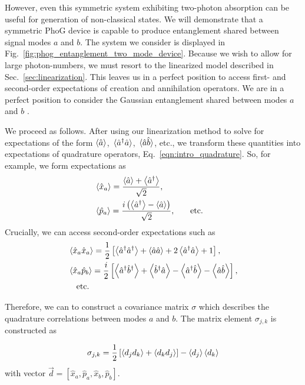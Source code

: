 However, even this symmetric system exhibiting two-photon absorption can be useful for generation of non-classical states. We will demonstrate that a symmetric PhoG device is capable to produce entanglement shared between signal modes $a$ and $b$. The system we consider is displayed in Fig.~\ref{fig:phog_entanglement_two_mode_device}. Because we wish to allow for large photon-numbers, we must resort to the linearized model described in Sec.~\ref{sec:linearization}. This leaves us in a perfect position to access first- and second-order expectations of creation and annihilation operators. We are in a perfect position to consider the Gaussian entanglement shared between modes $a$ and $b$ \cite{Weedbrook2012, Adesso2007, Simon2000}.

We proceed as follows. After using our linearization method to solve for expectations of the form $\ev{\hat{a}}$, $\ev*{\hat{a}^\dagger \hat{a}}$, $\ev*{\hat{a}\hat{b}}$, etc., we transform these quantities into expectations of quadrature operators, Eq.~\ref{eqn:intro_quadrature}. So, for example, we form expectations as 
\begin{align}
&\ev{\hat{x}_a} = \frac{\ev{\hat{a}} + \ev{\hat{a}^\dagger}}{\sqrt{2}}, \notag \\
%
&\ev{\hat{p}_a} = \frac{i \left(\ev{\hat{a}^\dagger} - \ev{\hat{a}}\right)}{\sqrt{2}}, &\qq{etc.}\notag 
\end{align}
Crucially, we can access second-order expectations such as
\begin{align}
&\ev{\hat{x}_a \hat{x}_a} = \frac{1}{2}\left[\ev{\hat{a}^\dagger \hat{a}^\dagger} + \ev{\hat{a} \hat{a}} + 2 \ev{\hat{a}^\dagger \hat{a}} + 1\right], \notag \\
%
&\ev{\hat{x}_a \hat{p}_b} = \frac{i}{2}\left[\ev{\hat{a}^\dagger \hat{b}^\dagger} + \ev{\hat{b}^\dagger \hat{a}} - \ev{\hat{a}^\dagger \hat{b}} - \ev{\hat{a} \hat{b}} \right], \notag \\
%
&\qq{etc.} \notag
\end{align}

\noindent Therefore, we can to construct a covariance matrix $\sigma$ \cite{Weedbrook2012} which describes the quadrature correlations between modes $a$ and $b$. The matrix element $\sigma_{j, k}$ is constructed as %

\begin{equation}\label{eqn:covariance matrix}
\sigma_{j, k} = \frac{1}{2} \left[ \ev{d_j d_k} + \ev{d_k d_j}\right] - \ev{d_j} \ev{d_k}
\end{equation}
with vector $\overrightarrow{d} = \left[\hat{x}_a, \hat{p}_a, \hat{x}_b, \hat{p}_b \right]$.

